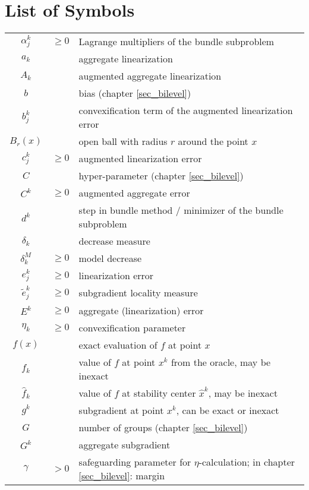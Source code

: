 \section*{List of Symbols}


\begin{longtable}{c@{}c@{} l@{}}
	 \(\alpha_j^k\) & \(\geq 0\)& Lagrange multipliers of the bundle subproblem \\
	\(a_k\) && aggregate linearization \\
	\(A_k\) && augmented aggregate linearization \\
	\(b\) && bias (chapter \ref{sec_bilevel}) \\
	\(b^k_j\) && convexification term of the augmented linearization error \\
	\(B_r(x)\) && open ball with radius \(r\) around the point \(x\) \\
	\(c_j^k\) & \(\geq 0\)& augmented linearization error \\
	\(C\) && hyper-parameter (chapter \ref{sec_bilevel}) \\
	\(C^k\)	&\(\geq 0\)& augmented aggregate error \\
	\(d^k\) && step in bundle method / minimizer of the bundle subproblem \\
	\(\delta_k\) && decrease measure \\
	\(\delta^M_k\) & \(\geq 0\) & model decrease \\
	\(e_j^k\) & \(\geq 0 \)& linearization error \\
	\(\tilde{e}^k_j\) & \(\geq 0\) & subgradient locality measure \\
	\(E^k\) & \(\geq 0\) & aggregate (linearization) error \\
	\(\eta_k\) & \(\geq 0\) & convexification parameter \\
	\(f(x)\) && exact evaluation of \(f\) at point \(x\) \\
	\(f_k\) && value of \(f\) at point \(x^k\) from the oracle, may be inexact \\
	\(\hat{f}_k\) && value of \(f\) at stability center \(\hat{x}^k\), may be inexact \\
	\(g^k\) && subgradient at point \(x^k\), can be exact or inexact \\
	\(G\) && number of groups (chapter \ref{sec_bilevel}) \\
	\(G^k\) && aggregate subgradient \\
	\(\gamma\) & \(>0\) & safeguarding parameter for \(\eta\)-calculation; in chapter \ref{sec_bilevel}: margin \\

\end{longtable}
